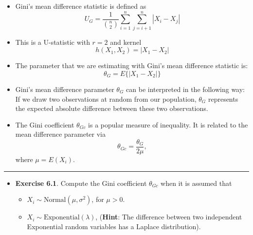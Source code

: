\documentclass[]{book}
\providecommand{\tightlist}{%
  \setlength{\itemsep}{0pt}\setlength{\parskip}{0pt}}
\begin{document}
\begin{itemize}
\item
  Gini's mean difference statistic is defined as
  \begin{equation}
  U_{G} = \frac{1}{{n \choose 2}} \sum_{i=1}^{n}\sum_{j=i+1}^{n} | X_{i} - X_{j} | \nonumber
  \end{equation}
\item
  This is a U-statistic with \(r=2\) and kernel
  \begin{equation}
  h(X_{1},X_{2}) = | X_{1} - X_{2} | \nonumber
  \end{equation}
\item
  The parameter that we are estimating with Gini's mean difference statistic is:
  \begin{equation}
  \theta_{G} = E\Big\{ \Big| X_{1} - X_{2} \Big|  \Big\}  \nonumber
  \end{equation}
\item
  Gini's mean difference parameter \(\theta_{G}\) can be interpreted in the following way: If we draw
  two observations at random from our population, \(\theta_{G}\)
  represents the expected absolute difference between these
  two observations.
\item
  The Gini coefficient \(\theta_{Gc}\) is a popular measure of inequality. It is related
  to the mean difference parameter via
  \begin{equation}
  \theta_{Gc} = \frac{ \theta_{G}}{ 2\mu },  \nonumber
  \end{equation}
  where \(\mu = E( X_{i} )\).
\end{itemize}

\begin{center}\rule{0.5\linewidth}{\linethickness}\end{center}

\begin{itemize}
\tightlist
\item
  \textbf{Exercise 6.1}. Compute the Gini coefficient \(\theta_{Gc}\) when it is assumed that

  \begin{itemize}
  \tightlist
  \item
    \(X_{i} \sim \textrm{Normal}( \mu, \sigma^{2})\), for \(\mu > 0\).
  \item
    \(X_{i} \sim \textrm{Exponential}(\lambda)\), (\textbf{Hint}: The difference between two independent Exponential random variables has a Laplace distribution).
  \end{itemize}
\end{itemize}
\end{document}
